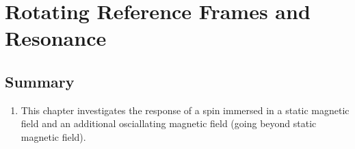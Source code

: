 \section{Rotating Reference Frames and Resonance}

\subsection{Summary}
\begin{enumerate}
    \item This chapter investigates the response of a spin immersed in a static magnetic field and an additional osciallating magnetic field (going beyond static magnetic field).

\end{enumerate}